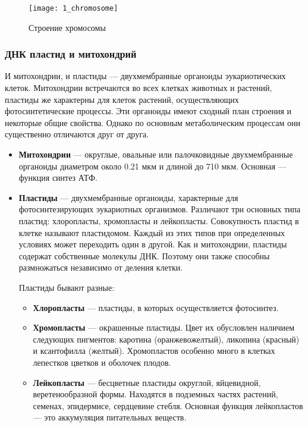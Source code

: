 \begin{figure}[H]
	\centering
	\texttt{[image: 1\_chromosome]}
	\caption{Строение хромосомы}
\end{figure}

\subsubsection{ДНК пластид и митохондрий}

И митохондрии, и пластиды --- двухмембранные органоиды эукариотических клеток. Митохондрии встречаются во всех клетках животных и растений, пластиды же характерны для клеток растений, осуществляющих фотосинтетические процессы. Эти органоиды имеют сходный план строения и некоторые общие свойства. Однако по основным метаболическим процессам они существенно отличаются друг от друга.

\begin{itemize}
	\item \textbf{Митохондрии} --- округлые, овальные или палочковидные двухмембранные органоиды диаметром около 0.21 мкм и длиной до 710 мкм. Основная --- функция синтез АТФ.
	
	\item \textbf{Пластиды} --- двухмембранные органоиды, характерные для фотосинтезирующих эукариотных организмов. Различают три основных типа пластид: хлоропласты, хромопласты и лейкопласты. Совокупность пластид в клетке называют пластидомом. Каждый из этих типов при определенных условиях может переходить один в другой. Как и митохондрии, пластиды содержат собственные молекулы ДНК. Поэтому они также способны размножаться независимо от деления клетки.
	
	Пластиды бывают разные:
	
	\begin{itemize}
		\item \textbf{Хлоропласты} --- пластиды, в которых осуществляется фотосинтез.
		
		\item \textbf{Хромопласты} --- окрашенные пластиды. Цвет их обусловлен наличием следующих пигментов: каротина (оранжевожелтый), ликопина (красный) и ксантофилла (желтый). Хромопластов особенно много в клетках лепестков цветков и оболочек плодов.
		
		\item \textbf{Лейкопласты} --- бесцветные пластиды округлой, яйцевидной, веретенообразной формы. Находятся в подземных частях растений, семенах, эпидермисе, сердцевине стебля. Основная функция лейкопластов --- это аккумуляция питательных веществ.
	\end{itemize}
\end{itemize}

